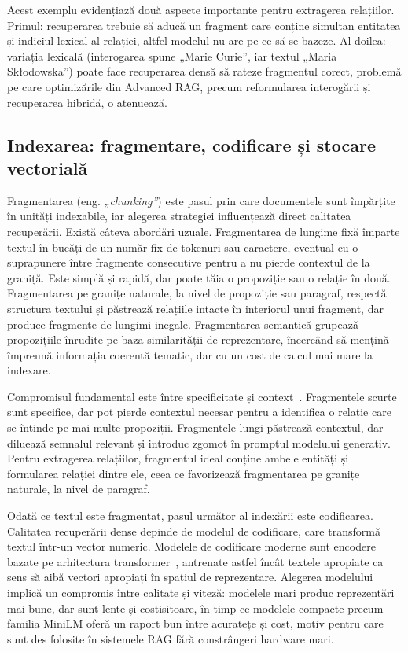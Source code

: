 Acest exemplu evidențiază două aspecte importante pentru extragerea relațiilor. Primul: recuperarea trebuie să aducă un fragment care conține simultan entitatea și indiciul lexical al relației, altfel modelul nu are pe ce să se bazeze. Al doilea: variația lexicală (interogarea spune „Marie Curie”, iar textul „Maria Skłodowska”) poate face recuperarea densă să rateze fragmentul corect, problemă pe care optimizările din Advanced RAG, precum reformularea interogării și recuperarea hibridă, o atenuează.

\subsection{Indexarea: fragmentare, codificare și stocare vectorială}

Fragmentarea (eng. \textit{„chunking”}) este pasul prin care documentele sunt împărțite în unități indexabile, iar alegerea strategiei influențează direct calitatea recuperării. Există câteva abordări uzuale. Fragmentarea de lungime fixă împarte textul în bucăți de un număr fix de tokenuri sau caractere, eventual cu o suprapunere între fragmente consecutive pentru a nu pierde contextul de la graniță. Este simplă și rapidă, dar poate tăia o propoziție sau o relație în două. Fragmentarea pe granițe naturale, la nivel de propoziție sau paragraf, respectă structura textului și păstrează relațiile intacte în interiorul unui fragment, dar produce fragmente de lungimi inegale. Fragmentarea semantică grupează propozițiile înrudite pe baza similarității de reprezentare, încercând să mențină împreună informația coerentă tematic, dar cu un cost de calcul mai mare la indexare.

Compromisul fundamental este între specificitate și context~\cite{gao2024retrievalaugmentedgenerationlargelanguage}. Fragmentele scurte sunt specifice, dar pot pierde contextul necesar pentru a identifica o relație care se întinde pe mai multe propoziții. Fragmentele lungi păstrează contextul, dar diluează semnalul relevant și introduc zgomot în promptul modelului generativ. Pentru extragerea relațiilor, fragmentul ideal conține ambele entități și formularea relației dintre ele, ceea ce favorizează fragmentarea pe granițe naturale, la nivel de paragraf.

Odată ce textul este fragmentat, pasul următor al indexării este codificarea. Calitatea recuperării dense depinde de modelul de codificare, care transformă textul într-un vector numeric. Modelele de codificare moderne sunt encodere bazate pe arhitectura transformer~\cite{vaswani2017attention}, antrenate astfel încât textele apropiate ca sens să aibă vectori apropiați în spațiul de reprezentare. Alegerea modelului implică un compromis între calitate și viteză: modelele mari produc reprezentări mai bune, dar sunt lente și costisitoare, în timp ce modelele compacte precum familia MiniLM oferă un raport bun între acuratețe și cost, motiv pentru care sunt des folosite în sistemele RAG fără constrângeri hardware mari.

